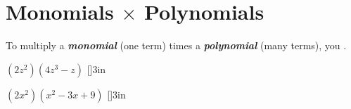 \section{Monomials $\times$ Polynomials}

\vfil 

\begin{tcolorbox}[center,width=5.5in]
    \large
    To multiply a {\bfseries\itshape monomial} (one term) 
    times a 
    {\bfseries\itshape polynomial} (many terms),
    you .
\end{tcolorbox}

\vfil 

    {
        $ (2z^2)  (4z^3 - z) $
    }
    [\large]{3in}


\myWideProblem
    {
        $ (2x^2)  (x^2 -3x + 9) $
    }
    [\large]{3in}
